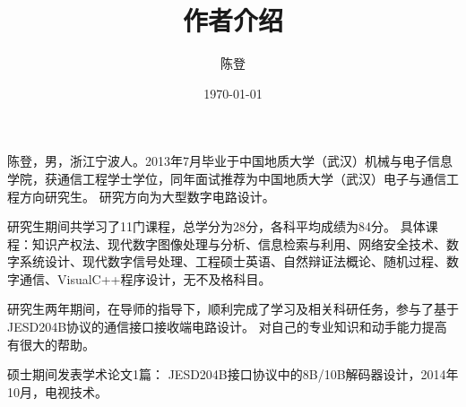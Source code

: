 \documentclass[UTF8]{ctexart}
\title{作者介绍}
\author{陈登}
\date{\today}
\begin{document}
陈登，男，浙江宁波人。2013年7月毕业于中国地质大学（武汉）机械与电子信息学院，获通信工程学士学位，同年面试推荐为中国地质大学（武汉）电子与通信工程方向研究生。
研究方向为大型数字电路设计。

研究生期间共学习了11门课程，总学分为28分，各科平均成绩为84分。
具体课程：知识产权法、现代数字图像处理与分析、信息检索与利用、网络安全技术、数字系统设计、现代数字信号处理、工程硕士英语、自然辩证法概论、随机过程、数字通信、VisualC++程序设计，无不及格科目。

研究生两年期间，在导师的指导下，顺利完成了学习及相关科研任务，参与了基于JESD204B协议的通信接口接收端电路设计。
对自己的专业知识和动手能力提高有很大的帮助。

硕士期间发表学术论文1篇：
JESD204B接口协议中的8B/10B解码器设计，2014年10月，电视技术。


\end{document}
